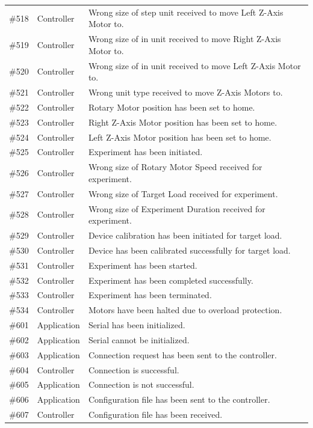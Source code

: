 \documentclass[12pt]{report}
\begin{document}
{\begin{longtable}{|l|l|p{9cm}|}
\#518 & Controller & Wrong size of step unit received to move Left Z-Axis Motor to. \\
\#519 & Controller & Wrong size of in unit received to move Right Z-Axis Motor to. \\
\#520 & Controller & Wrong size of in unit received to move Left Z-Axis Motor to. \\
\#521 & Controller & Wrong unit type received to move Z-Axis Motors to. \\
\#522 & Controller & Rotary Motor position has been set to home. \\
\#523 & Controller & Right Z-Axis Motor position has been set to home. \\
\#524 & Controller & Left Z-Axis Motor position has been set to home. \\
\#525 & Controller & Experiment has been initiated. \\
\#526 & Controller & Wrong size of Rotary Motor Speed received for experiment. \\
\#527 & Controller & Wrong size of Target Load received for experiment. \\
\#528 & Controller & Wrong size of Experiment Duration received for experiment. \\
\#529 & Controller & Device calibration has been initiated for target load. \\
\#530 & Controller & Device has been calibrated successfully for target load. \\
\#531 & Controller & Experiment has been started. \\
\#532 & Controller & Experiment has been completed successfully. \\
\#533 & Controller & Experiment has been terminated. \\
\#534 & Controller & Motors have been halted due to overload protection. \\
\#601 & Application & Serial has been initialized. \\
\#602 & Application & Serial cannot be initialized. \\
\#603 & Application & Connection request has been sent to the controller. \\
\#604 & Controller & Connection is successful. \\
\#605 & Application & Connection is not successful. \\
\#606 & Application & Configuration file has been sent to the controller. \\
\#607 & Controller & Configuration file has been received. \\

\end{longtable}}
\end{document}
